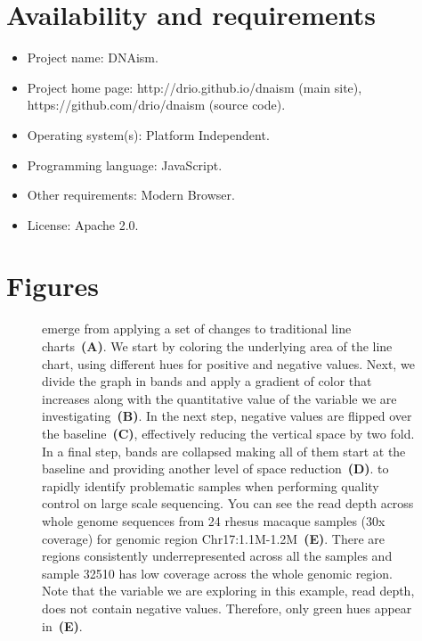 \documentclass[twocolumn]{bmcart}
\begin{document}
\section*{Availability and requirements}
\enspace
\begin{itemize}
  \item Project name: DNAism.
  \item Project home page: http://drio.github.io/dnaism (main site), https://github.com/drio/dnaism (source code).
  \item Operating system(s): Platform Independent.
  \item Programming language: JavaScript.
  \item Other requirements: Modern Browser.
  \item License: Apache 2.0.
\end{itemize}





\section*{Figures}
\begin{figure}[h!]

\caption{
   emerge from applying a set of changes to traditional line
  charts~\textbf{(A)}. We start by coloring the underlying area of the line chart,
  using different hues for positive and negative values. Next, we divide the
  graph in bands and apply a gradient of color that increases along with the
  quantitative value of the variable we are investigating~\textbf{(B)}. In the
  next step, negative values are flipped over the baseline~\textbf{(C)},
  effectively reducing the vertical space by two fold. In a final step, bands are
  collapsed making all of them start at the baseline and providing another level
  of space reduction~\textbf{(D)}.  
   to rapidly identify problematic samples
  when performing quality control on large scale sequencing.
  You can see the read depth across whole genome sequences from 24 rhesus macaque
  samples (30x coverage) for genomic region Chr17:1.1M-1.2M~\textbf{(E)}.
  There are regions consistently underrepresented across all the
  samples and sample 32510 has low coverage across the whole genomic region.
  Note that the variable we are exploring in this example, read depth, does not
  contain negative values. Therefore, only green hues appear in~\textbf{(E)}.
}\label{fig:01}

\end{figure}
\end{document}
